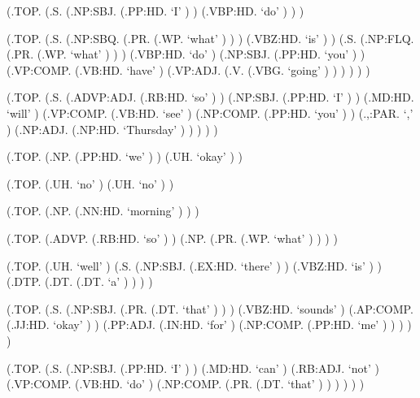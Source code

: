 \documentclass[10pt]{article}
\begin{document}
\begin{parsetree}  (.TOP. (.S. (.NP:SBJ. (.PP:HD. `I' ) ) (.VBP:HD. `do' ) ) ) \end{parsetree}

\begin{parsetree}  (.TOP. (.S. (.NP:SBQ. (.PR. (.WP. `what' ) ) ) (.VBZ:HD. `is' ) ) (.S. (.NP:FLQ. (.PR. (.WP. `what' ) ) ) (.VBP:HD. `do' ) (.NP:SBJ. (.PP:HD. `you' ) ) (.VP:COMP. (.VB:HD. `have' ) (.VP:ADJ. (.V. (.VBG. `going' ) ) ) ) ) ) \end{parsetree}

\begin{parsetree}  (.TOP. (.S. (.ADVP:ADJ. (.RB:HD. `so' ) ) (.NP:SBJ. (.PP:HD. `I' ) ) (.MD:HD. `will' ) (.VP:COMP. (.VB:HD. `see' ) (.NP:COMP. (.PP:HD. `you' ) ) (.,:PAR. `,' ) (.NP:ADJ. (.NP:HD. `Thursday' ) ) ) ) ) \end{parsetree}

\begin{parsetree}  (.TOP. (.NP. (.PP:HD. `we' ) ) (.UH. `okay' ) ) \end{parsetree}

\begin{parsetree}  (.TOP. (.UH. `no' ) (.UH. `no' ) ) \end{parsetree}

\begin{parsetree}  (.TOP. (.NP. (.NN:HD. `morning' ) ) ) \end{parsetree}

\begin{parsetree}  (.TOP. (.ADVP. (.RB:HD. `so' ) ) (.NP. (.PR. (.WP. `what' ) ) ) ) \end{parsetree}

\begin{parsetree}  (.TOP. (.UH. `well' ) (.S. (.NP:SBJ. (.EX:HD. `there' ) ) (.VBZ:HD. `is' ) ) (.DTP. (.DT. (.DT. `a' ) ) ) ) \end{parsetree}

\begin{parsetree}  (.TOP. (.S. (.NP:SBJ. (.PR. (.DT. `that' ) ) ) (.VBZ:HD. `sounds' ) (.AP:COMP. (.JJ:HD. `okay' ) ) (.PP:ADJ. (.IN:HD. `for' ) (.NP:COMP. (.PP:HD. `me' ) ) ) ) ) \end{parsetree}

\begin{parsetree}  (.TOP. (.S. (.NP:SBJ. (.PP:HD. `I' ) ) (.MD:HD. `can' ) (.RB:ADJ. `not' ) (.VP:COMP. (.VB:HD. `do' ) (.NP:COMP. (.PR. (.DT. `that' ) ) ) ) ) ) \end{parsetree}
\end{document}
